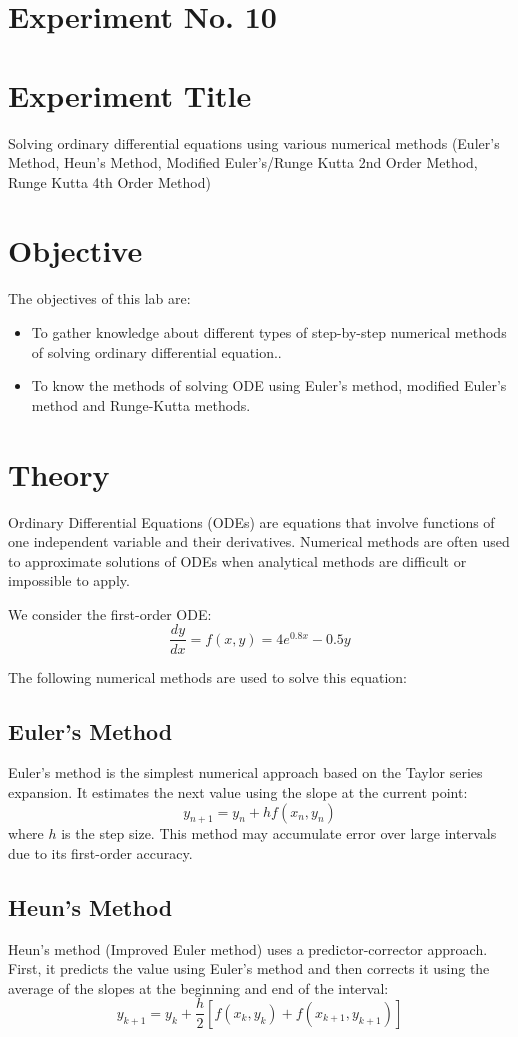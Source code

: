 \documentclass[a4paper,12pt]{article}
\begin{document}
	\section{Experiment No. 10}
	
	\section{Experiment Title }
	Solving ordinary differential equations using various numerical methods (Euler’s Method, Heun’s Method, Modified Euler’s/Runge Kutta 2nd Order Method, Runge Kutta 4th Order Method)
	\section{Objective}
	
	The objectives of this lab are:
	\begin{itemize}
		\item To gather knowledge about different types of step-by-step numerical methods of solving ordinary differential equation..
		\item To know the methods of solving ODE using Euler’s method, modified Euler’s method and Runge-Kutta methods.
	\end{itemize}
	\section*{Theory}
	
	Ordinary Differential Equations (ODEs) are equations that involve functions of one independent variable and their derivatives. Numerical methods are often used to approximate solutions of ODEs when analytical methods are difficult or impossible to apply.
	
	We consider the first-order ODE:
	\[
	\frac{dy}{dx} = f(x, y) = 4e^{0.8x} - 0.5y
	\]
	
	The following numerical methods are used to solve this equation:
	
	\subsection*{Euler’s Method}
	Euler’s method is the simplest numerical approach based on the Taylor series expansion. It estimates the next value using the slope at the current point:
	\[
	y_{n+1} = y_n + h f(x_n, y_n)
	\]
	where \( h \) is the step size. This method may accumulate error over large intervals due to its first-order accuracy.
	
	\subsection*{Heun’s Method}
	Heun’s method (Improved Euler method) uses a predictor-corrector approach. First, it predicts the value using Euler’s method and then corrects it using the average of the slopes at the beginning and end of the interval:
	\[
	y_{k+1} = y_k + \frac{h}{2} \left[f(x_k, y_k) + f(x_{k+1}, y_{k+1})\right]
	\]
	
\end{document}
